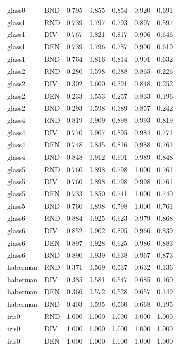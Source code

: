 \documentclass[10pt,a4paper]{article}
\begin{document}
\begin{longtable}{lllllrr}
glass0 & BND & 0.795 & 0.855 & 0.854 & 0.920 & 0.691 \\
glass1 & RND & 0.739 & 0.797 & 0.793 & 0.897 & 0.597 \\
glass1 & DIV & 0.767 & 0.821 & 0.817 & 0.906 & 0.646 \\
glass1 & DEN & 0.739 & 0.796 & 0.787 & 0.900 & 0.619 \\
glass1 & BND & 0.764 & 0.816 & 0.814 & 0.901 & 0.632 \\
glass2 & RND & 0.280 & 0.598 & 0.388 & 0.865 & 0.226 \\
glass2 & DIV & 0.302 & 0.600 & 0.391 & 0.848 & 0.252 \\
glass2 & DEN & 0.233 & 0.553 & 0.257 & 0.833 & 0.196 \\
glass2 & BND & 0.293 & 0.598 & 0.389 & 0.857 & 0.242 \\
glass4 & RND & 0.819 & 0.909 & 0.898 & 0.993 & 0.819 \\
glass4 & DIV & 0.770 & 0.907 & 0.895 & 0.984 & 0.771 \\
glass4 & DEN & 0.748 & 0.845 & 0.816 & 0.988 & 0.761 \\
glass4 & BND & 0.848 & 0.912 & 0.901 & 0.989 & 0.848 \\
glass5 & RND & 0.760 & 0.898 & 0.798 & 1.000 & 0.761 \\
glass5 & DIV & 0.760 & 0.898 & 0.798 & 0.998 & 0.761 \\
glass5 & DEN & 0.733 & 0.850 & 0.741 & 1.000 & 0.740 \\
glass5 & BND & 0.760 & 0.898 & 0.798 & 1.000 & 0.761 \\
glass6 & RND & 0.884 & 0.925 & 0.923 & 0.979 & 0.868 \\
glass6 & DIV & 0.852 & 0.902 & 0.895 & 0.966 & 0.839 \\
glass6 & DEN & 0.897 & 0.928 & 0.925 & 0.986 & 0.883 \\
glass6 & BND & 0.890 & 0.939 & 0.938 & 0.967 & 0.873 \\
haberman & RND & 0.371 & 0.569 & 0.537 & 0.632 & 0.136 \\
haberman & DIV & 0.385 & 0.581 & 0.547 & 0.685 & 0.160 \\
haberman & DEN & 0.366 & 0.572 & 0.528 & 0.657 & 0.149 \\
haberman & BND & 0.403 & 0.595 & 0.560 & 0.668 & 0.195 \\
iris0 & RND & 1.000 & 1.000 & 1.000 & 1.000 & 1.000 \\
iris0 & DIV & 1.000 & 1.000 & 1.000 & 1.000 & 1.000 \\
iris0 & DEN & 1.000 & 1.000 & 1.000 & 1.000 & 1.000 \\

\end{longtable}
\end{document}
